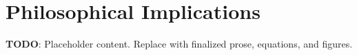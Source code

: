 
\section{Philosophical Implications}
\label{sec:philosophical-implications}

\textbf{TODO}: Placeholder content. Replace with finalized prose, equations, and figures.

